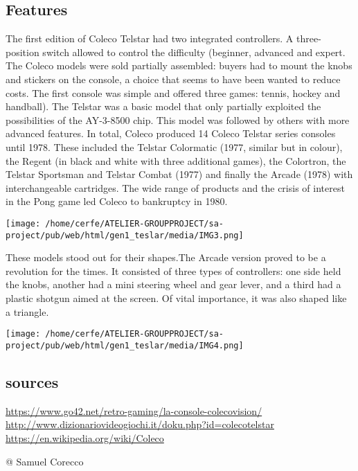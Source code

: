 \documentclass[a4paper,10pt]{book}
\begin{document}
 \subsection{Features }
 The first edition of Coleco Telstar had two integrated controllers.
          A three-position switch allowed to control the difficulty (beginner, advanced and expert. The Coleco models were sold partially assembled: buyers had to mount the knobs and stickers on the console, a choice that seems to have been wanted to reduce costs. The first console was simple and offered three games: tennis, hockey and handball). The Telstar was a basic model that only partially exploited the possibilities of the AY-3-8500 chip. This model was followed by others with more advanced features. In total, Coleco produced 14 Coleco Telstar series consoles until 1978. These included the Telstar Colormatic (1977, similar but in colour), the Regent (in black and white with three additional games), the Colortron, the Telstar Sportsman and Telstar Combat (1977) and finally the Arcade (1978) with interchangeable cartridges. The wide range of products and the crisis of interest in the Pong game led Coleco to bankruptcy in 1980.
 
 
 \texttt{[image: /home/cerfe/ATELIER-GROUPPROJECT/sa-project/pub/web/html/gen1\_teslar/media/IMG3.png]}
 
      These models stood out for their shapes.The Arcade version proved to be a revolution for the times. It consisted of three types of controllers: one side held the knobs, another had a mini steering wheel and gear lever, and a third had a plastic shotgun aimed at the screen. Of vital importance, it was also shaped like a triangle.

       
 \texttt{[image: /home/cerfe/ATELIER-GROUPPROJECT/sa-project/pub/web/html/gen1\_teslar/media/IMG4.png]}
 
 
 \subsection{sources }
 
 \href{https://www.go42.net/retro-gaming/la-console-colecovision/}{https://www.go42.net/retro-gaming/la-console-colecovision/ }
 \href{http://www.dizionariovideogiochi.it/doku.php?id=coleco_telstar}{http://www.dizionariovideogiochi.it/doku.php?id=colecotelstar }
 \href{https://en.wikipedia.org/wiki/Coleco}{https://en.wikipedia.org/wiki/Coleco }
 
 
 @ Samuel Corecco 
 
\end{document}
